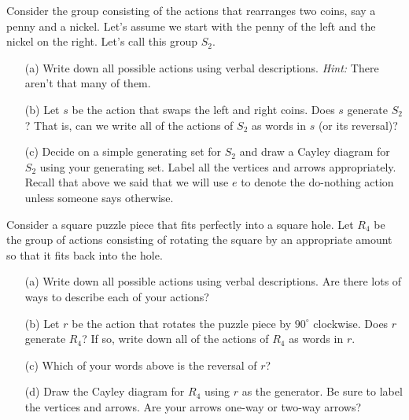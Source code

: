 \begin{exercise}
Consider the group consisting of the actions that rearranges two coins, say a penny and a nickel.  Let's assume we start with the penny of the left and the nickel on the right.  Let's call this group $S_2$.

\begin{enumerate}
\item[(a)] Write down all possible actions using verbal descriptions.  \emph{Hint:} There aren't that many of them.
\item[(b)] Let $s$ be the action that swaps the left and right coins.  Does $s$ generate $S_2$?  That is, can we write all of the actions of $S_2$ as words in $s$ (or its reversal)?
\item[(c)] Decide on a simple generating set for $S_2$ and draw a Cayley diagram for $S_2$ using your generating set.  Label all the vertices and arrows appropriately.  Recall that above we said that we will use $e$ to denote the do-nothing action unless someone says otherwise.
\end{enumerate}
\end{exercise}

\begin{exercise}\label{exer:introducing_R4}
Consider a square puzzle piece that fits perfectly into a square hole.  Let $R_4$ be the group of actions consisting of rotating the square by an appropriate amount so that it fits back into the hole.
\begin{enumerate}
\item[(a)] Write down all possible actions using verbal descriptions.  Are there lots of ways to describe each of your actions?
\item[(b)] Let $r$ be the action that rotates the puzzle piece by $90^\circ$ clockwise.  Does $r$ generate $R_4$?  If so, write down all of the actions of $R_4$ as words in $r$.
\item[(c)] Which of your words above is the reversal of $r$?
\item[(d)] Draw the Cayley diagram for $R_4$ using $r$ as the generator.  Be sure to label the vertices and arrows.  Are your arrows one-way or two-way arrows?
\end{enumerate}
\end{exercise}

